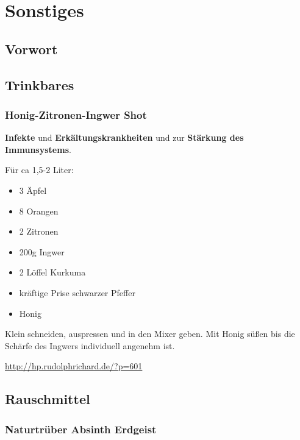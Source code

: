 \chapter{Sonstiges}

\section{Vorwort}

\lipsum[1-5]
\newpage



\section{Trinkbares}

\subsection{Honig-Zitronen-Ingwer Shot}


\textbf{Infekte} und \textbf{Erkältungskrankheiten} und zur \textbf{Stärkung des Immunsystems}. 

  

Für ca 1,5-2 Liter:
\begin{itemize}
	\item 3 Äpfel
	\item 8 Orangen
	\item 2 Zitronen
	\item 200g Ingwer
	\item 2 Löffel Kurkuma
	\item kräftige Prise schwarzer Pfeffer
	\item Honig
\end{itemize}

Klein schneiden, auspressen und in den Mixer geben. Mit Honig süßen bis die Schärfe des Ingwers individuell angenehm ist.

\url{http://hp.rudolphrichard.de/?p=601}




\newpage




\section{Rauschmittel}


\subsection{Naturtrüber Absinth Erdgeist}


